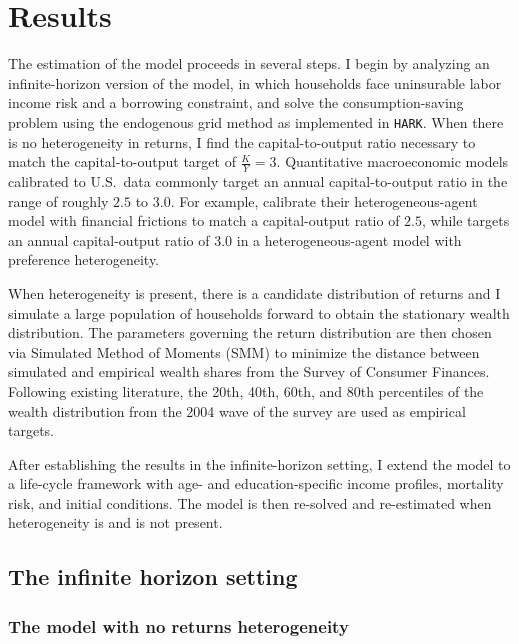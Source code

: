 \onlyinsubfile{\setcounter{section}{3}}
\section{Results}\notinsubfile{\label{sec:chapter1-results}}

\par The estimation of the model proceeds in several steps. I begin by analyzing an infinite-horizon version of the model, in which households face uninsurable labor income risk and a borrowing constraint, and solve the consumption-saving problem using the endogenous grid method as implemented in \texttt{HARK}. When there is no heterogeneity in returns, I find the capital-to-output ratio necessary to match the capital-to-output target of $\frac{K}{Y} = 3$. Quantitative macroeconomic models calibrated to U.S.\ data commonly target an annual capital-to-output ratio in the range of roughly $2.5$ to $3.0$. For example, \cite{LeeLuettickeRavn2021} calibrate their heterogeneous-agent model with financial frictions to match a capital-output ratio of $2.5$, while \cite{Suen2012} targets an annual capital-output ratio of $3.0$ in a heterogeneous-agent model with preference heterogeneity.

\par When heterogeneity is present, there is a candidate distribution of returns and I simulate a large population of households forward to obtain the stationary wealth distribution. The parameters governing the return distribution are then chosen via Simulated Method of Moments (SMM) to minimize the distance between simulated and empirical wealth shares from the Survey of Consumer Finances. Following existing literature, the 20th, 40th, 60th, and 80th percentiles of the wealth distribution from the 2004 wave of the survey are used as empirical targets.

\par After establishing the results in the infinite-horizon setting, I extend the model to a life-cycle framework with age- and education-specific income profiles, mortality risk, and initial conditions. The model is then re-solved and re-estimated when heterogeneity is and is not present.


\subsection{The infinite horizon setting}
\subsubsection{The model with no returns heterogeneity}

